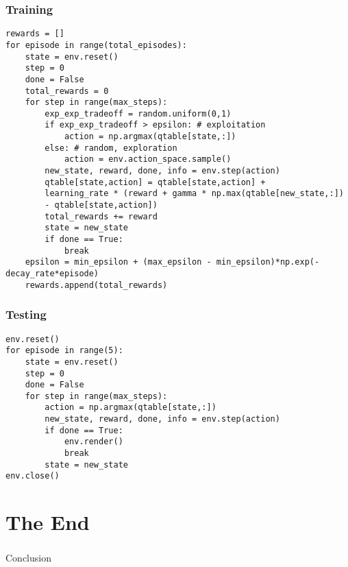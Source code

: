 \begin{frame}[fragile]\frametitle{Training}

\begin{lstlisting}
rewards = []
for episode in range(total_episodes):
	state = env.reset()
	step = 0
	done = False
	total_rewards = 0
	for step in range(max_steps):
		exp_exp_tradeoff = random.uniform(0,1)
		if exp_exp_tradeoff > epsilon: # exploitation
			action = np.argmax(qtable[state,:])
		else: # random, exploration
			action = env.action_space.sample()
		new_state, reward, done, info = env.step(action)
		qtable[state,action] = qtable[state,action] + 
		learning_rate * (reward + gamma * np.max(qtable[new_state,:]) 
		- qtable[state,action]) 
		total_rewards += reward
		state = new_state
		if done == True:
			break
	epsilon = min_epsilon + (max_epsilon - min_epsilon)*np.exp(-decay_rate*episode)
	rewards.append(total_rewards)

\end{lstlisting}

\end{frame}

\begin{frame}[fragile]\frametitle{Testing}

\begin{lstlisting}
env.reset()
for episode in range(5):
	state = env.reset()
	step = 0
	done = False
	for step in range(max_steps):
		action = np.argmax(qtable[state,:])
		new_state, reward, done, info = env.step(action)
		if done == True:
			env.render()
			break
		state = new_state
env.close()
\end{lstlisting}

\end{frame}



\section[End]{The End}

\begin{frame}[fragile]\frametitle{}
\begin{center}
{\Large Conclusion}
\end{center}
\end{frame}


